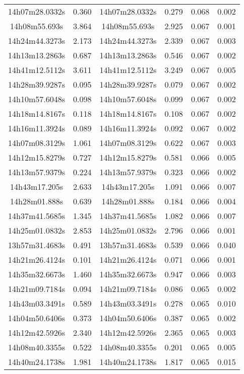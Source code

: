 \begin{table}
\begin{tabular}{cccccc}
14h07m28.0332s & 0.360 & 14h07m28.0332s & 0.279 & 0.068 & 0.002 \\
14h08m55.693s & 3.864 & 14h08m55.693s & 2.925 & 0.067 & 0.001 \\
14h24m44.3273s & 2.173 & 14h24m44.3273s & 2.339 & 0.067 & 0.003 \\
14h13m13.2863s & 0.687 & 14h13m13.2863s & 0.546 & 0.067 & 0.002 \\
14h41m12.5112s & 3.611 & 14h41m12.5112s & 3.249 & 0.067 & 0.005 \\
14h28m39.9287s & 0.095 & 14h28m39.9287s & 0.079 & 0.067 & 0.002 \\
14h10m57.6048s & 0.098 & 14h10m57.6048s & 0.099 & 0.067 & 0.002 \\
14h18m14.8167s & 0.118 & 14h18m14.8167s & 0.108 & 0.067 & 0.002 \\
14h16m11.3924s & 0.089 & 14h16m11.3924s & 0.092 & 0.067 & 0.002 \\
14h07m08.3129s & 1.061 & 14h07m08.3129s & 0.622 & 0.067 & 0.003 \\
14h12m15.8279s & 0.727 & 14h12m15.8279s & 0.581 & 0.066 & 0.005 \\
14h13m57.9379s & 0.224 & 14h13m57.9379s & 0.323 & 0.066 & 0.002 \\
14h43m17.205s & 2.633 & 14h43m17.205s & 1.091 & 0.066 & 0.007 \\
14h28m01.888s & 0.639 & 14h28m01.888s & 0.184 & 0.066 & 0.004 \\
14h37m41.5685s & 1.345 & 14h37m41.5685s & 1.082 & 0.066 & 0.007 \\
14h25m01.0832s & 2.853 & 14h25m01.0832s & 2.796 & 0.066 & 0.001 \\
13h57m31.4683s & 0.491 & 13h57m31.4683s & 0.539 & 0.066 & 0.040 \\
14h21m26.4124s & 0.101 & 14h21m26.4124s & 0.071 & 0.066 & 0.001 \\
14h35m32.6673s & 1.460 & 14h35m32.6673s & 0.947 & 0.066 & 0.003 \\
14h21m09.7184s & 0.094 & 14h21m09.7184s & 0.086 & 0.065 & 0.002 \\
14h43m03.3491s & 0.589 & 14h43m03.3491s & 0.278 & 0.065 & 0.010 \\
14h04m50.6406s & 0.373 & 14h04m50.6406s & 0.387 & 0.065 & 0.002 \\
14h12m42.5926s & 2.340 & 14h12m42.5926s & 2.365 & 0.065 & 0.003 \\
14h08m40.3355s & 0.522 & 14h08m40.3355s & 0.201 & 0.065 & 0.005 \\
14h40m24.1738s & 1.981 & 14h40m24.1738s & 1.817 & 0.065 & 0.015 \\

\end{tabular}
\end{table}
